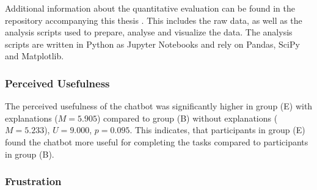 Additional information about the quantitative evaluation can be found in the repository accompanying this thesis \parencite{Goepfert2025}. This includes the raw data, as well as the analysis scripts used to prepare, analyse and visualize the data. The analysis scripts are written in Python as Jupyter Notebooks and rely on Pandas, SciPy and Matplotlib.

\subsubsection{Perceived Usefulness} \label{sssec:model_acceptance}

The perceived usefulness of the chatbot was significantly higher in group (E) with explanations ($M=5.905$) compared to group (B) without explanations ($M=5.233$), $U=9.000$, $p=0.095$. This indicates, that participants in group (E) found the chatbot more useful for completing the tasks compared to participants in group (B).

\subsubsection{Frustration} \label{sssec:frustration}
